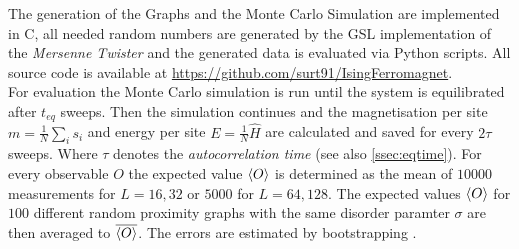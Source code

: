 The generation of the Graphs and the Monte Carlo Simulation are implemented
in C, all needed random numbers are generated by the GSL \cite{GSL}
implementation of the \emph{Mersenne Twister} \cite{Matsumoto1998} and
the generated data is evaluated via Python scripts.
All source code is available at \url{https://github.com/surt91/IsingFerromagnet}.\\

For evaluation the Monte Carlo simulation is run until the system
is equilibrated after \(t_{eq}\) sweeps. Then the simulation continues
and the magnetisation per site \(m=\frac{1}{N}\sum_i s_i\) and energy
per site \(E=\frac{1}{N}\hat H\) are calculated and saved for every
\(2\tau\) sweeps. Where \(\tau\) denotes the \emph{autocorrelation time}
(see also \ref{ssec:eqtime}).
For every observable \(O\) the expected value \(\left< O \right>\) is determined
as the mean of \(10000\) measurements for \(L=16,32\) or \(5000\) for
\(L=64,128\). The expected values \(\left< O \right>\) for \(100\) different
random proximity graphs with the same disorder paramter \(\sigma\)
are then averaged to \(\overline{\left< O \right>}\). The errors are estimated
by bootstrapping \cite{Bootstrap}.

